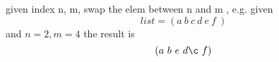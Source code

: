given index n, m, swap the elem between n and m ,
e.g. given
$$list=(a\ b\ c\ d\ e\ f\ )$$
and $n=2,m=4$
the result is
$$(a\ b\ e\ d \c \ f)$$
\bye